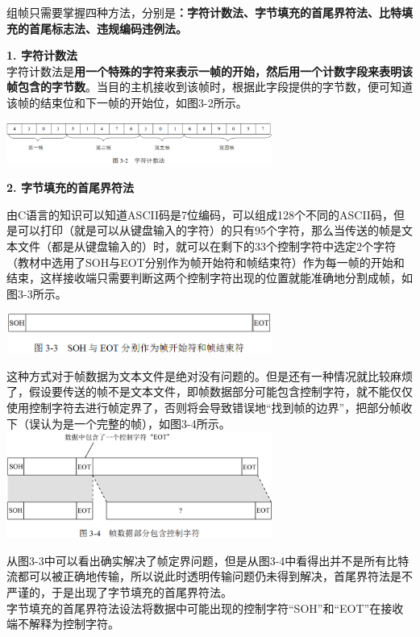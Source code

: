 组帧只需要掌握四种方法，分别是\textbf{：字符计数法、字节填充的首尾界符法、比特填充的首尾标志法、违规编码违例法。}

\textbf{{1. 字符计数法}}\\

字符计数法是\textbf{{用一个特殊的字符来表示一帧的开始，然后用一个计数字段来表明该帧包含的字节数}}。当目的主机接收到该帧时，根据此字段提供的字节数，便可知道该帧的结束位和下一帧的开始位，如图3-2所示。

\includegraphics[width=3.43750in,height=0.55208in]{png-jpeg-pics/33417908A56A9F2D821F07E23FBD244B.png}

\textbf{{2. 字节填充的首尾界符法}}

由C语言的知识可以知道ASCII码是7位编码，可以组成128个不同的ASCII码，但是可以打印（就是可以从键盘输入的字符）的只有95个字符，那么当传送的帧是文本文件（都是从键盘输入的）时，就可以在剩下的33个控制字符中选定2个字符（教材中选用了SOH与EOT分别作为帧开始符和帧结束符）作为每一帧的开始和结束，这样接收端只需要判断这两个控制字符出现的位置就能准确地分割成帧，如图3-3所示。

\includegraphics[width=3.43750in,height=0.52083in]{png-jpeg-pics/1DA8665C7083D19C0B49D679D4A326FD.png}

这种方式对于帧数据为文本文件是绝对没有问题的。但是还有一种情况就比较麻烦了，假设要传送的帧不是文本文件，即帧数据部分可能包含控制字符，就不能仅仅使用控制字符去进行帧定界了，否则将会导致错误地``找到帧的边界''，把部分帧收下（误认为是一个完整的帧），如图3-4所示。\\
\includegraphics[width=3.43750in,height=1.37500in]{png-jpeg-pics/A2D71F83E75A76E0EC484845517030F7.png}

从图3-3中可以看出确实解决了帧定界问题，但是从图3-4中看得出并不是所有比特流都可以被正确地传输，所以说此时透明传输问题仍未得到解决，首尾界符法是不严谨的，于是出现了字节填充的首尾界符法。\\
字节填充的首尾界符法设法将数据中可能出现的控制字符``SOH''{和``EOT''在接收端不解释为控制字符。}

